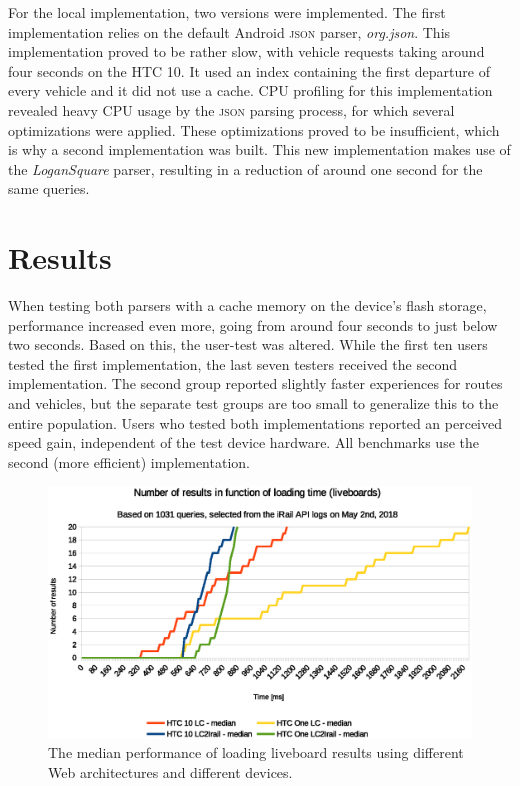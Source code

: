 \documentclass[twocolumn]{phdsymp} %
\begin{document}
For the local implementation, two versions were implemented. The first implementation relies on the default Android \textsc{json} parser, \emph{org.json}. This implementation proved to be rather slow, with vehicle requests taking around four seconds on the HTC 10. It used an index containing the first departure of every vehicle and it did not use a cache. CPU profiling for this implementation revealed heavy CPU usage by the \textsc{json} parsing process, for which several optimizations were applied. These optimizations proved to be insufficient, which is why a second implementation was built. This new implementation makes use of the \emph{LoganSquare} parser, resulting in a reduction of around one second for the same queries.

\section{Results}

When testing both parsers with a cache memory on the device’s flash storage, performance increased even more, going from around four seconds to just below two seconds. Based on this, the user-test was altered. While the first ten users tested the first implementation, the last seven testers received the second implementation. The second group reported slightly faster experiences for routes and vehicles, but the separate test groups are too small to generalize this to the entire population. Users who tested both implementations reported an perceived speed gain, independent of the test device hardware. All benchmarks use the second (more efficient) implementation.


\begin{figure}[ht]
	\begin{center}
		\includegraphics[width=.50\textwidth]{images/dief_liveboards_average.eps}
		\caption{\label{fig:liveboard} The median performance of loading liveboard results using different Web architectures and different devices.}
	\end{center}
\end{figure}
\end{document}

